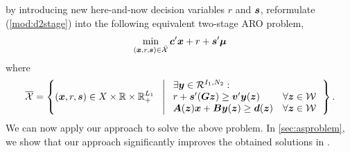 \documentclass[fleqn,mnsc,blindrev]{informs4}
\newcommand{\mb}[1]{\mbox{\boldmath \ensuremath{#1}}}
\begin{document}
		by introducing new here-and-now decision variables $r$ and $\mb{s}$, \cite{bsz17} reformulate (\ref{mod:d2stage}) into the following equivalent two-stage ARO problem,
\begin{equation*}
		\min_{(\boldsymbol{x}, r, \boldsymbol{s})  \in \bar{\mathcal{X}}}  \mb{c}'\mb{x} +  r+\mb{s}{'}\mb{\mu}
\end{equation*}
		where
\begin{equation*}
			\overline{\mathcal{X}} = \left\{ (\mb{x},r,\mb{s}) \in X \times \mathbb{R} \times  \mathbb{R}^{L_1}_+ \ \hspace{3pt} \left|  
			\hspace{3pt} 
			\begin{array}{ll}
				\exists \mb{y} \in \mathcal{R}^{I_1,N_2}: \\
				r+\mb{s}{'}(\mb{G}\mb{z}) \geq \mb{v}'\mb{y}(\mb{z}) &  \forall \mb{z} \in \mathcal{W} \\
				\mb{A}(\mb{z})\mb{x}+\mb{B}\mb{y}(\mb{z}) \geq\mb{d}(\mb{z}) &   \forall \mb{z} \in \mathcal{W} 
			\end{array} \right.
			\right\}.
\end{equation*}
		We can now apply our approach to solve the above problem.  In \textsection \ref{sec:asproblem},  we show that our approach significantly improves the obtained solutions in \cite{bsz17}.
		
\end{document}

